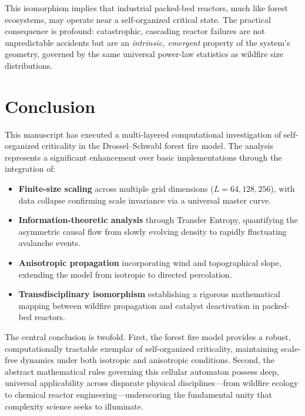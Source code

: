 \documentclass[12pt, a4paper]{article}
\begin{document}
This isomorphism implies that industrial packed-bed reactors, much like forest ecosystems, may operate near a self-organized critical state. The practical consequence is profound: catastrophic, cascading reactor failures are not unpredictable accidents but are an \emph{intrinsic, emergent} property of the system's geometry, governed by the same universal power-law statistics as wildfire size distributions.


\section{Conclusion}
\label{sec:conclusion}

This manuscript has executed a multi-layered computational investigation of self-organized criticality in the Drossel--Schwabl forest fire model. The analysis represents a significant enhancement over basic implementations through the integration of:

\begin{itemize}
    \item \textbf{Finite-size scaling} across multiple grid dimensions ($L = 64, 128, 256$), with data collapse confirming scale invariance via a universal master curve.
    \item \textbf{Information-theoretic analysis} through Transfer Entropy, quantifying the asymmetric causal flow from slowly evolving density to rapidly fluctuating avalanche events.
    \item \textbf{Anisotropic propagation} incorporating wind and topographical slope, extending the model from isotropic to directed percolation.
    \item \textbf{Transdisciplinary isomorphism} establishing a rigorous mathematical mapping between wildfire propagation and catalyst deactivation in packed-bed reactors.
\end{itemize}

The central conclusion is twofold. First, the forest fire model provides a robust, computationally tractable exemplar of self-organized criticality, maintaining scale-free dynamics under both isotropic and anisotropic conditions. Second, the abstract mathematical rules governing this cellular automaton possess deep, universal applicability across disparate physical disciplines---from wildfire ecology to chemical reactor engineering---underscoring the fundamental unity that complexity science seeks to illuminate.
\end{document}

